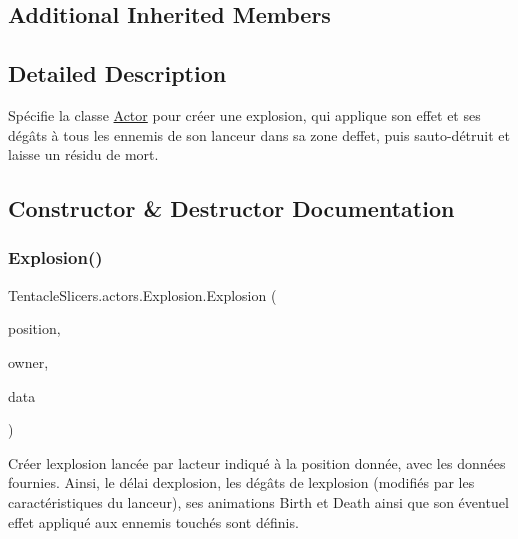 \subsection*{Additional Inherited Members}


\subsection{Detailed Description}
Spécifie la classe \hyperlink{class_tentacle_slicers_1_1actors_1_1_actor}{Actor} pour créer une explosion, qui applique son effet et ses dégâts à tous les ennemis de son lanceur dans sa zone d\textquotesingle{}effet, puis s\textquotesingle{}auto-\/détruit et laisse un résidu de mort. 



\subsection{Constructor \& Destructor Documentation}
\mbox{\label{class_tentacle_slicers_1_1actors_1_1_explosion_a9e1355a2064d65ee17c91414e9586fff}} 
\subsubsection{\texorpdfstring{Explosion()}{Explosion()}}
{\footnotesize\ttfamily Tentacle\+Slicers.\+actors.\+Explosion.\+Explosion (\begin{DoxyParamCaption}\item[{\hyperlink{class_tentacle_slicers_1_1general_1_1_point}{Point}}]{position,  }\item[{\hyperlink{class_tentacle_slicers_1_1actors_1_1_living_actor}{Living\+Actor}}]{owner,  }\item[{\hyperlink{class_tentacle_slicers_1_1actors_1_1_explosion_data}{Explosion\+Data}}]{data }\end{DoxyParamCaption})}



Créer l\textquotesingle{}explosion lancée par l\textquotesingle{}acteur indiqué à la position donnée, avec les données fournies. Ainsi, le délai d\textquotesingle{}explosion, les dégâts de l\textquotesingle{}explosion (modifiés par les caractéristiques du lanceur), ses animations Birth et Death ainsi que son éventuel effet appliqué aux ennemis touchés sont définis. 


